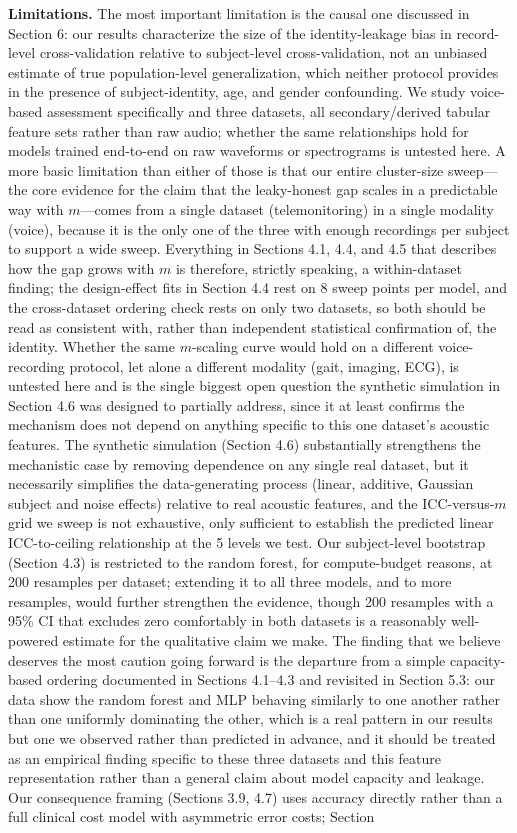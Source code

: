 \documentclass[11pt]{article}
\begin{document}
\textbf{Limitations.} The most important limitation is the causal one discussed in Section 6: our results characterize the size of the identity-leakage bias in record-level cross-validation relative to subject-level cross-validation, not an unbiased estimate of true population-level generalization, which neither protocol provides in the presence of subject-identity, age, and gender confounding. We study voice-based assessment specifically and three datasets, all secondary/derived tabular feature sets rather than raw audio; whether the same relationships hold for models trained end-to-end on raw waveforms or spectrograms is untested here. A more basic limitation than either of those is that our entire cluster-size sweep---the core evidence for the claim that the leaky-honest gap scales in a predictable way with $m$---comes from a single dataset (telemonitoring) in a single modality (voice), because it is the only one of the three with enough recordings per subject to support a wide sweep. Everything in Sections 4.1, 4.4, and 4.5 that describes how the gap grows with $m$ is therefore, strictly speaking, a within-dataset finding; the design-effect fits in Section 4.4 rest on 8 sweep points per model, and the cross-dataset ordering check rests on only two datasets, so both should be read as consistent with, rather than independent statistical confirmation of, the identity. Whether the same $m$-scaling curve would hold on a different voice-recording protocol, let alone a different modality (gait, imaging, ECG), is untested here and is the single biggest open question the synthetic simulation in Section 4.6 was designed to partially address, since it at least confirms the mechanism does not depend on anything specific to this one dataset's acoustic features. The synthetic simulation (Section 4.6) substantially strengthens the mechanistic case by removing dependence on any single real dataset, but it necessarily simplifies the data-generating process (linear, additive, Gaussian subject and noise effects) relative to real acoustic features, and the ICC-versus-$m$ grid we sweep is not exhaustive, only sufficient to establish the predicted linear ICC-to-ceiling relationship at the 5 levels we test. Our subject-level bootstrap (Section 4.3) is restricted to the random forest, for compute-budget reasons, at 200 resamples per dataset; extending it to all three models, and to more resamples, would further strengthen the evidence, though 200 resamples with a 95\% CI that excludes zero comfortably in both datasets is a reasonably well-powered estimate for the qualitative claim we make. The finding that we believe deserves the most caution going forward is the departure from a simple capacity-based ordering documented in Sections 4.1--4.3 and revisited in Section 5.3: our data show the random forest and MLP behaving similarly to one another rather than one uniformly dominating the other, which is a real pattern in our results but one we observed rather than predicted in advance, and it should be treated as an empirical finding specific to these three datasets and this feature representation rather than a general claim about model capacity and leakage. Our consequence framing (Sections 3.9, 4.7) uses accuracy directly rather than a full clinical cost model with asymmetric error costs; Section 
\end{document}
